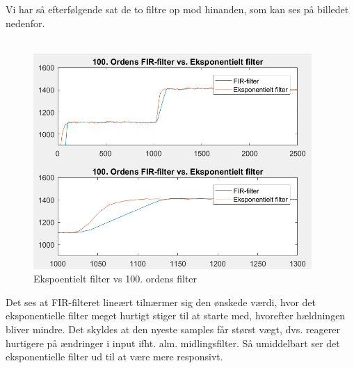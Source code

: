 Vi har så efterfølgende sat de to filtre op mod hinanden, som kan ses på billedet nedenfor.\\
\\

\begin{figure}[H]
	\centering
	\includegraphics[width = 300pt]{Img/Ekspoentielt_filter.PNG}
	\caption{Ekspoentielt filter vs 100. ordens filter}
	\label{fig:Ekspoentielt_filter}
\end{figure}


Det ses at FIR-filteret lineært tilnærmer sig den ønskede værdi, hvor det eksponentielle filter meget hurtigt stiger til at starte med, hvorefter hældningen bliver mindre. Det skyldes at den nyeste samples får størst vægt, dvs. reagerer
hurtigere på ændringer i input ifht. alm.
midlingsfilter. Så umiddelbart ser det eksponentielle filter ud til
at være mere responsivt.